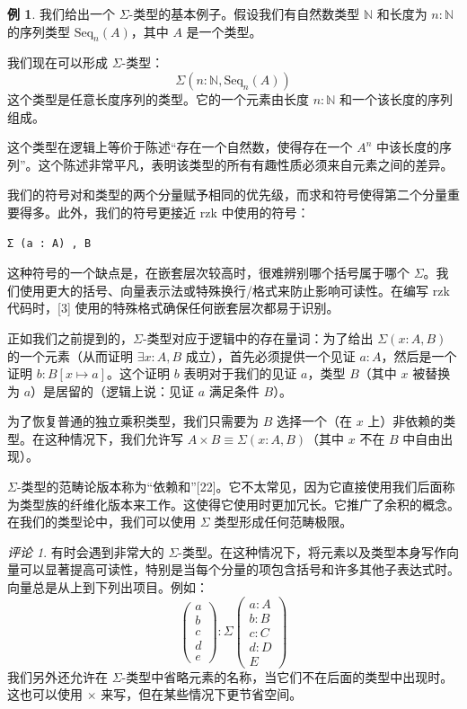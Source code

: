 \documentclass{ctexrep}
\theoremstyle{plain}
\theoremstyle{definition}
\newtheorem{example}[theorem]{例}
\theoremstyle{remark}
\newtheorem{remark}[theorem]{评论}
\theoremstyle{definition}
\theoremstyle{definition}
\theoremstyle{definition}
\begin{document}
\begin{example}
我们给出一个 $\Sigma$-类型的基本例子。假设我们有自然数类型 $\mathbb{N}$ 和长度为 $n:\mathbb{N}$ 的序列类型 $\mathrm{Seq}_n(A)$，其中 $A$ 是一个类型。

我们现在可以形成 $\Sigma$-类型：
\[
\Sigma(n:\mathbb{N},\mathrm{Seq}_n(A))
\]
这个类型是任意长度序列的类型。它的一个元素由长度 $n:\mathbb{N}$ 和一个该长度的序列组成。

这个类型在逻辑上等价于陈述“存在一个自然数，使得存在一个 $A^n$ 中该长度的序列”。这个陈述非常平凡，表明该类型的所有有趣性质必须来自元素之间的差异。

我们的符号对和类型的两个分量赋予相同的优先级，而求和符号使得第二个分量重要得多。此外，我们的符号更接近 \textsf{rzk} 中使用的符号：
\begin{verbatim}
Σ (a : A) , B
\end{verbatim}

这种符号的一个缺点是，在嵌套层次较高时，很难辨别哪个括号属于哪个 $\Sigma$。我们使用更大的括号、向量表示法或特殊换行/格式来防止影响可读性。在编写 \textsf{rzk} 代码时，[3] 使用的特殊格式确保任何嵌套层次都易于识别。
\end{example}

正如我们之前提到的，$\Sigma$-类型对应于逻辑中的存在量词：为了给出 $\Sigma(x:A,B)$ 的一个元素（从而证明 $\exists x:A,B$ 成立），首先必须提供一个见证 $a:A$，然后是一个证明 $b:B[x\mapsto a]$。这个证明 $b$ 表明对于我们的见证 $a$，类型 $B$（其中 $x$ 被替换为 $a$）是居留的（逻辑上说：见证 $a$ 满足条件 $B$）。

为了恢复普通的独立乘积类型，我们只需要为 $B$ 选择一个（在 $x$ 上）非依赖的类型。在这种情况下，我们允许写 $A\times B\equiv \Sigma(x:A,B)$（其中 $x$ 不在 $B$ 中自由出现）。

$\Sigma$-类型的范畴论版本称为“依赖和”[22]。它不太常见，因为它直接使用我们后面称为类型族的纤维化版本来工作。这使得它使用时更加冗长。它推广了余积的概念。在我们的类型论中，我们可以使用 $\Sigma$ 类型形成任何范畴极限。

\begin{remark}
有时会遇到非常大的 $\Sigma$-类型。在这种情况下，将元素以及类型本身写作向量可以显著提高可读性，特别是当每个分量的项包含括号和许多其他子表达式时。向量总是从上到下列出项目。例如：
\[
\begin{pmatrix} a \\ b \\ c \\ d \\ e \end{pmatrix} : \Sigma \begin{pmatrix} a:A \\ b:B \\ c:C \\ d:D \\ E \end{pmatrix}
\]
我们另外还允许在 $\Sigma$-类型中省略元素的名称，当它们不在后面的类型中出现时。这也可以使用 $\times$ 来写，但在某些情况下更节省空间。
\end{remark}
\end{document}
